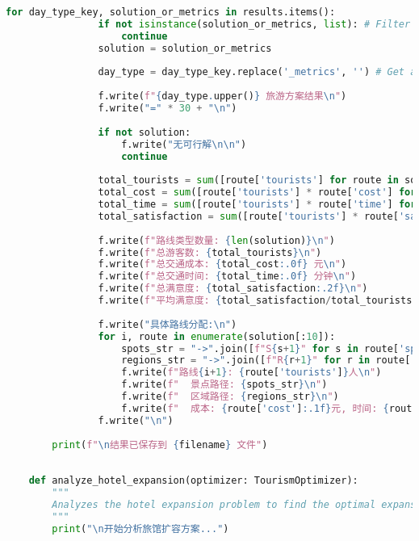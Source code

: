 \begin{lstlisting}[language=Python]
            for day_type_key, solution_or_metrics in results.items():
                if not isinstance(solution_or_metrics, list): # Filter out metrics dictionary
                    continue
                solution = solution_or_metrics
    
                day_type = day_type_key.replace('_metrics', '') # Get actual day_type
                
                f.write(f"{day_type.upper()} 旅游方案结果\n")
                f.write("=" * 30 + "\n")
                
                if not solution:
                    f.write("无可行解\n\n")
                    continue
                
                total_tourists = sum([route['tourists'] for route in solution])
                total_cost = sum([route['tourists'] * route['cost'] for route in solution])
                total_time = sum([route['tourists'] * route['time'] for route in solution])
                total_satisfaction = sum([route['tourists'] * route['satisfaction'] for route in solution])
                
                f.write(f"路线类型数量: {len(solution)}\n")
                f.write(f"总游客数: {total_tourists}\n")
                f.write(f"总交通成本: {total_cost:.0f} 元\n")
                f.write(f"总交通时间: {total_time:.0f} 分钟\n")
                f.write(f"总满意度: {total_satisfaction:.2f}\n")
                f.write(f"平均满意度: {total_satisfaction/total_tourists:.2f}\n\n")
                
                f.write("具体路线分配:\n")
                for i, route in enumerate(solution[:10]):
                    spots_str = "->".join([f"S{s+1}" for s in route['spots']])
                    regions_str = "->".join([f"R{r+1}" for r in route['regions']])
                    f.write(f"路线{i+1}: {route['tourists']}人\n")
                    f.write(f"  景点路径: {spots_str}\n")
                    f.write(f"  区域路径: {regions_str}\n")
                    f.write(f"  成本: {route['cost']:.1f}元, 时间: {route['time']:.1f}分钟, 偏好: {route['preference']}\n\n")
                f.write("\n")
        
        print(f"\n结果已保存到 {filename} 文件")
    
    
    def analyze_hotel_expansion(optimizer: TourismOptimizer):
        """
        Analyzes the hotel expansion problem to find the optimal expansion area and scale.
        """
        print("\n开始分析旅馆扩容方案...")
    

\end{lstlisting}
